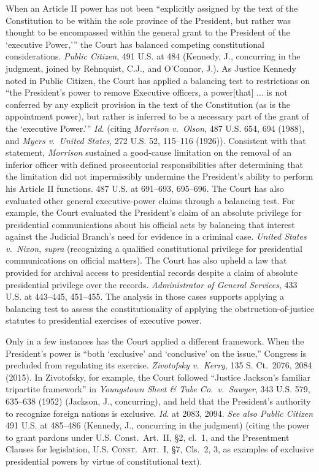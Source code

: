 When an Article II power has not been “explicitly assigned by the text of the Constitution to be within the sole province of the President, but rather was thought to be encompassed within the general grant to the President of the ‘executive Power,’” the Court has balanced competing constitutional considerations.
\textit{Public Citizen}, 491 U.S. at 484 (Kennedy, J., concurring in the judgment, joined by Rehnquist, C.J., and O’Connor, J.).
As Justice Kennedy noted in Public Citizen, the Court has applied a balancing test to restrictions on “the President’s power to remove Executive officers, a power[that] ... is not conferred by any explicit provision in the text of the Constitution (as is the appointment power), but rather is inferred to be a necessary part of the grant of the ‘executive Power.’”
\textit{Id}. (citing \textit{Morrison v.\ Olson}, 487 U.S. 654, 694 (1988), and \textit{Myers v.\ United States}, 272 U.S. 52, 115--116 (1926)).
Consistent with that statement, \textit{Morrison} sustained a good-cause limitation on the removal of an inferior officer with defined prosecutorial responsibilities after determining that the limitation did not impermissibly undermine the President’s ability to perform his Article II functions.
487 U.S. at 691--693, 695--696.
The Court has also evaluated other general executive-power claims through a balancing test.
For example, the Court evaluated the President’s claim of an absolute privilege for presidential communications about his official acts by balancing that interest against the Judicial Branch’s need for evidence in a criminal case.
\textit{United States v.\ Nixon}, \textit{supra} (recognizing a qualified constitutional privilege for presidential communications on official matters).
The Court has also upheld a law that provided for archival access to presidential records despite a claim of absolute presidential privilege over the records.
\textit{Administrator of General Services}, 433 U.S. at 443--445, 451--455.
The analysis in those cases supports applying a balancing test to assess the constitutionality of applying the obstruction-of-justice statutes to presidential exercises of executive power.

Only in a few instances has the Court applied a different framework.
When the President’s power is “both ‘exclusive’ and ‘conclusive’ on the issue,” Congress is precluded from regulating its exercise.
\textit{Zivotofsky v.\ Kerry}, 135 S. Ct.~2076, 2084 (2015).
In Zivotofsky, for example, the Court followed “Justice Jackson’s familiar tripartite framework” in \textit{Youngstown Sheet \& Tube Co.\ v.\ Sawyer}, 343 U.S. 579, 635--638 (1952) (Jackson, J., concurring), and held that the President’s authority to recognize foreign nations is exclusive.
\textit{Id}. at 2083, 2094.
\textit{See also Public Citizen} 491 U.S. at 485--486 (Kennedy, J., concurring in the judgment) (citing the power to grant pardons under U.S. Const.\ Art.~II, \S 2, cl.~1, and the Presentment Clauses for legislation, \textsc{U.S. Const.\ Art.~I}, \S 7, Cls.~2, 3, as examples of exclusive presidential powers by virtue of constitutional text).

